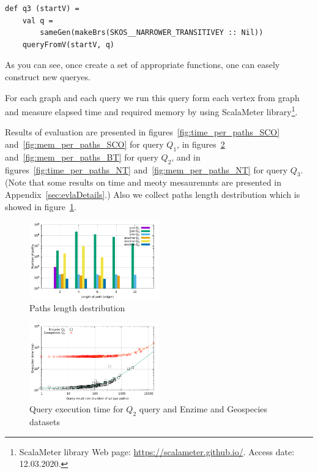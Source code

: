 \begin{lstlisting}
def q3 (startV) =
    val q =
        sameGen(makeBrs(SKOS__NARROWER_TRANSITIVEY :: Nil))
    queryFromV(startV, q)
\end{lstlisting}

As you can see, once create a set of appropriate functions, one can easely construct new queryes.

For each graph and each query we run this query form each vertex from graph and measure elapsed time and required memory by using ScalaMeter library\footnote{ScalaMeter library Web page: \url{https://scalameter.github.io/}. Access date: 12.03.2020.}.

Results of evaluation are presented in figures~\ref{fig:time_per_paths_SCO} and~\ref{fig:mem_per_paths_SCO} for query $Q_1$, in figures~\ref{fig:time_per_paths_BT} and~\ref{fig:mem_per_paths_BT} for query $Q_2$, and in figures~\ref{fig:time_per_paths_NT} and~\ref{fig:mem_per_paths_NT} for query $Q_3$. 
(Note that some results on time and meoty mesauremnts are presented in Appendix~\ref{sec:evlaDetails}.) 
Also we collect paths length destribution which is showed in figure~\ref{fig:pLength}.

\begin{figure}[ht]
  \begin{center}
    \includegraphics[width=0.5\textwidth]{data/path_per_length.pdf}
    \caption{Paths length destribution}\label{fig:pLength}
  \end{center}
\end{figure}

\begin{figure}[ht]
  \begin{center}
    \includegraphics[width=0.5\textwidth]{data/time_per_paths_BT.pdf}
    \caption{Query execution time for $Q_2$ query and Enzime and Geospecies datasets}
    \label{fig:time_per_paths_BT}
  \end{center}
\end{figure}


